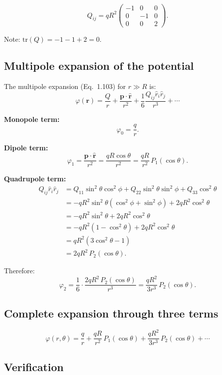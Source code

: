 \documentclass[12pt]{article}
\newcommand{\vect}[1]{\mathbf{#1}}
\begin{document}
\[
\boxed{Q_{ij} = qR^2\begin{pmatrix} -1 & 0 & 0 \\ 0 & -1 & 0 \\ 0 & 0 & 2 \end{pmatrix}}.
\]

Note: $\text{tr}(Q) = -1 - 1 + 2 = 0$. \checkmark

\subsection*{Multipole expansion of the potential}

The multipole expansion (Eq.~1.103) for $r \gg R$ is:
\[
\varphi(\vect{r}) = \frac{Q}{r} + \frac{\vect{p}\cdot\hat{\vect{r}}}{r^2} + \frac{1}{6}\frac{Q_{ij}\hat{r}_i\hat{r}_j}{r^3} + \cdots
\]

\textbf{Monopole term:}
\[
\varphi_0 = \frac{q}{r}.
\]

\textbf{Dipole term:}
\[
\varphi_1 = \frac{\vect{p}\cdot\hat{\vect{r}}}{r^2} = \frac{qR\cos\theta}{r^2} = \frac{qR}{r^2}\,P_1(\cos\theta).
\]

\textbf{Quadrupole term:}
\begin{align}
Q_{ij}\hat{r}_i\hat{r}_j &= Q_{11}\sin^2\theta\cos^2\phi + Q_{22}\sin^2\theta\sin^2\phi + Q_{33}\cos^2\theta \\
&= -qR^2\sin^2\theta(\cos^2\phi + \sin^2\phi) + 2qR^2\cos^2\theta \\
&= -qR^2\sin^2\theta + 2qR^2\cos^2\theta \\
&= -qR^2(1 - \cos^2\theta) + 2qR^2\cos^2\theta \\
&= qR^2(3\cos^2\theta - 1) \\
&= 2qR^2\,P_2(\cos\theta).
\end{align}

Therefore:
\[
\varphi_2 = \frac{1}{6}\cdot\frac{2qR^2\,P_2(\cos\theta)}{r^3} = \frac{qR^2}{3r^3}\,P_2(\cos\theta).
\]

\subsection*{Complete expansion through three terms}

\[
\boxed{\varphi(r,\theta) = \frac{q}{r} + \frac{qR}{r^2}\,P_1(\cos\theta) + \frac{qR^2}{3r^3}\,P_2(\cos\theta) + \cdots}
\]

\subsection*{Verification}
\end{document}
